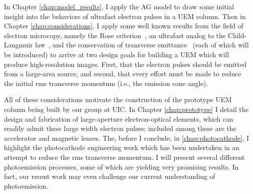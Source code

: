 In Chapter \ref{chap:model_results}, I apply the AG model to draw some initial insight into the behaviors of ultrafast electron pulses in a UEM column.
Then in Chapter \ref{chap:considerations}, I apply some well known results from the field of electron microcopy, namely the Rose criterion~\cite{rose_television_1948}, an ultrafast analog to the Child-Langmuir law~\cite{child_discharge_1911,langmuir_effect_1923,valfells_effects_2002}, and the conservation of transverse emittance~\cite{jensen_emittance_2010} (each of which will be introduced) to arrive at two design goals for building a UEM which will produce high-resolution images.
First, that the electron pulses should be emitted from a large-area source, and second, that every effort must be made to reduce the initial rms transverse momentum (i.e., the emission cone angle).

All of these considerations motivate the construction of the prototype UEM column being built by our group at UIC.
In Chapter \ref{chap:prototype} I detail the design and fabrication of large-aperture electron-optical elements, which can readily admit these large width electron pulses; included among these are the accelerator and magnetic lenses.
The, before I conclude, in \ref{chap:photocathode}, I highlight the photocathode engineering work which has been undertaken in an attempt to reduce the rms transverse momentum.
I will present several different photoemission processes, some of which are yielding very promising results.
In fact, our recent work may even challenge our current understanding of photoemission.

